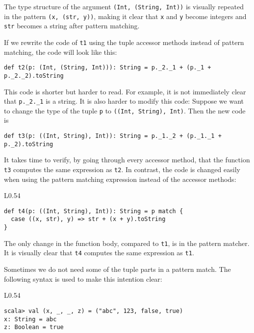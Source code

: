 \noindent The type structure of the argument \lstinline!(Int, (String, Int))!
is visually repeated in the pattern \lstinline!(x, (str, y))!, making
it clear that \lstinline!x! and \lstinline!y! become integers and
\lstinline!str! becomes a string after pattern matching.

If we rewrite the code of \lstinline!t1! using the tuple accessor
methods instead of pattern matching, the code will look like this:
\begin{lstlisting}
def t2(p: (Int, (String, Int))): String = p._2._1 + (p._1 + p._2._2).toString
\end{lstlisting}
This code is shorter but harder to read. For example, it is not immediately
clear that \lstinline!p._2._1! is a string. It is also harder to
modify this code: Suppose we want to change the type of the tuple
\lstinline!p! to \lstinline!((Int, String), Int)!. Then the new
code is
\begin{lstlisting}
def t3(p: ((Int, String), Int)): String = p._1._2 + (p._1._1 + p._2).toString
\end{lstlisting}
It takes time to verify, by going through every accessor method, that
the function \lstinline!t3! computes the same expression as \lstinline!t2!.
In contrast, the code is changed easily when using the pattern matching
expression instead of the accessor methods:\hfill{}~\begin{wrapfigure}{L}{0.54\columnwidth}%
\vspace{-0.8\baselineskip}
\begin{lstlisting}
def t4(p: ((Int, String), Int)): String = p match {
  case ((x, str), y) => str + (x + y).toString
}
\end{lstlisting}
\vspace{-0.6\baselineskip}
\end{wrapfigure}%

\noindent The only change in the function body, compared to \lstinline!t1!,
is in the pattern matcher. It is visually clear that \lstinline!t4!
computes the same expression as \lstinline!t1!.

Sometimes we do not need some of the tuple parts in a pattern match.
The following syntax is used to make this intention clear:

\begin{wrapfigure}{L}{0.54\columnwidth}%
\vspace{-0.8\baselineskip}
\begin{lstlisting}
scala> val (x, _, _, z) = ("abc", 123, false, true)
x: String = abc
z: Boolean = true
\end{lstlisting}
\vspace{-0.6\baselineskip}
\end{wrapfigure}%

